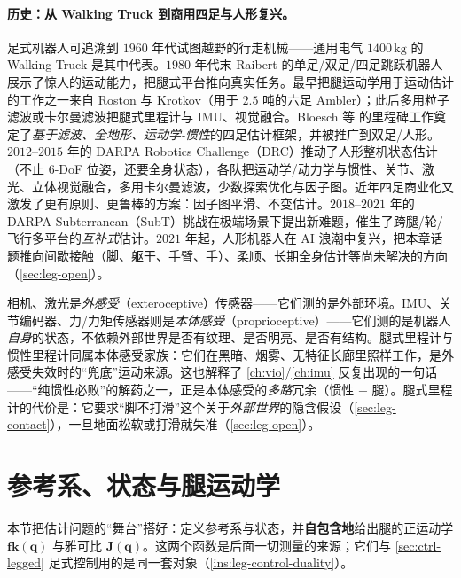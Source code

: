 \paragraph{历史：从 Walking Truck 到商用四足与人形复兴。}
足式机器人可追溯到 $1960$ 年代试图越野的行走机械——通用电气 $1400\,\mathrm{kg}$ 的 Walking Truck 是其中代表\cite{carlone2026handbook}。$1980$ 年代末 Raibert 的单足/双足/四足跳跃机器人展示了惊人的运动能力，把腿式平台推向真实任务。最早把腿运动学用于运动估计的工作之一来自 Roston 与 Krotkov（用于 $2.5$ 吨的六足 Ambler）；此后多用粒子滤波或卡尔曼滤波把腿式里程计与 IMU、视觉融合。Bloesch 等\cite{bloesch2013state} 的里程碑工作奠定了\emph{基于滤波、全地形、运动学-惯性}的四足估计框架，并被推广到双足/人形。$2012$–$2015$ 年的 DARPA Robotics Challenge（DRC）推动了人形整机状态估计（不止 $6$-DoF 位姿，还要全身状态），各队把运动学/动力学与惯性、关节、激光\cite{carlone2026handbook}、立体视觉融合，多用卡尔曼滤波，少数探索优化与因子图。近年四足商业化又激发了更有原则、更鲁棒的方案：因子图平滑\cite{hartley2018legged,wisth2023vilens}、不变估计\cite{hartley2020contact}。$2018$–$2021$ 年的 DARPA Subterranean（SubT）挑战在极端场景下提出新难题，催生了跨腿/轮/飞行多平台的\emph{互补式}估计。$2021$ 年起，人形机器人在 AI 浪潮中复兴，把本章话题推向间歇接触（脚、躯干、手臂、手）、柔顺、长期全身估计等尚未解决的方向（\cref{sec:leg-open}）。

\begin{insight}\label{ins:leg-proprioceptive}
相机、激光是\emph{外感受}（exteroceptive）传感器——它们测的是外部环境。IMU、关节编码器、力/力矩传感器则是\emph{本体感受}（proprioceptive）——它们测的是机器人\emph{自身}的状态，不依赖外部世界是否有纹理、是否明亮、是否有结构。腿式里程计与惯性里程计同属本体感受家族：它们在黑暗、烟雾、无特征长廊里照样工作，是外感受失效时的“兜底”运动来源。这也解释了 \cref{ch:vio}/\cref{ch:imu} 反复出现的一句话——“纯惯性必败”的解药之一，正是本体感受的\emph{多路}冗余（惯性 + 腿）。腿式里程计的代价是：它要求“脚不打滑”这个关于\emph{外部世界}的隐含假设（\cref{sec:leg-contact}），一旦地面松软或打滑就失准（\cref{sec:leg-open}）。
\end{insight}

\section{参考系、状态与腿运动学}
\label{sec:leg-kinematics}

本节把估计问题的“舞台”搭好：定义参考系与状态，并\textbf{自包含地}给出腿的正运动学 $\mathbf{fk}(\mathbf{q})$ 与雅可比 $\mathbf{J}(\mathbf{q})$。这两个函数是后面一切测量的来源；它们与 \cref{sec:ctrl-legged} 足式控制用的是同一套对象（\cref{ins:leg-control-duality}）。

